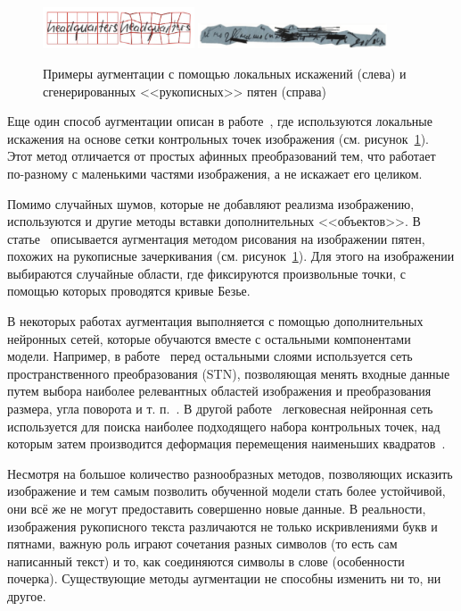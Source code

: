 \begin{figure}[h!]
    \centering
    \includegraphics[width=0.4\textwidth]{img/aug_local}
    \includegraphics[width=0.5\textwidth]{img/aug_blots}
    \caption{Примеры аугментации с помощью локальных искажений (слева) и сгенерированных <<рукописных>> пятен (справа)}
    \label{fig:augmentation}
\end{figure}

Еще один способ аугментации описан в работе~\cite{wigington2017data}, где используются локальные искажения на основе сетки контрольных точек изображения (см. рисунок~\ref{fig:augmentation}).
Этот метод отличается от простых афинных преобразований тем, что работает по-разному с маленькими частями изображения, а не искажает его целиком.

Помимо случайных шумов, которые не добавляют реализма изображению, используются и другие методы вставки дополнительных <<объектов>>.
В статье~\cite{shonenkov2021stackmix} описывается аугментация методом рисования на изображении пятен, похожих на рукописные зачеркивания (см. рисунок~\ref{fig:augmentation}).
Для этого на изображении выбираются случайные области, где фиксируются произвольные точки, с помощью которых проводятся кривые Безье.

В некоторых работах аугментация выполняется с помощью дополнительных нейронных сетей, которые обучаются вместе с остальными компонентами модели.
Например, в работе~\cite{krishnan2018word} перед остальными слоями используется сеть пространственного преобразования (STN),
позволяющая менять входные данные путем выбора наиболее релевантных областей изображения и преобразования размера, угла поворота и т. п.~\cite{jaderberg2015spatial}.
В другой работе~\cite{luo2020learn} легковесная нейронная сеть используется для поиска наиболее подходящего набора
контрольных точек, над которым затем производится деформация перемещения наименьших квадратов~\cite{schaefer2006image}.

Несмотря на большое количество разнообразных методов, позволяющих исказить изображение и тем самым позволить обученной
модели стать более устойчивой, они всё же не могут предоставить совершенно новые данные.
В реальности, изображения рукописного текста различаются не только искривлениями букв и пятнами, важную роль играют
сочетания разных символов (то есть сам написанный текст) и то, как соединяются символы в слове (особенности почерка).
Существующие методы аугментации не способны изменить ни то, ни другое.

